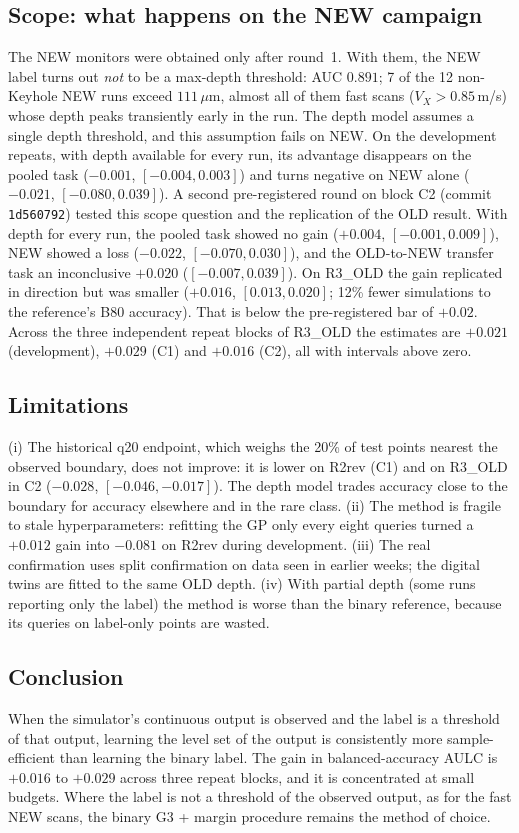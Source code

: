 \subsection{Scope: what happens on the NEW campaign}
The NEW monitors were obtained only after round~1. With them, the NEW label turns out \emph{not} to be a max-depth
threshold: AUC $0.891$; 7 of the 12 non-Keyhole NEW runs exceed $111\,\mu$m, almost all of them fast scans
($V_X>0.85$\,m/s) whose depth peaks transiently early in the run. The depth model assumes a single depth threshold,
and this assumption fails on NEW. On the development repeats, with depth available for every run, its advantage
disappears on the pooled task ($-0.001$, $[-0.004, 0.003]$) and turns negative on NEW alone ($-0.021$,
$[-0.080, 0.039]$). A second pre-registered round on block C2 (commit \texttt{1d560792}) tested this scope question and the
replication of the OLD result. With depth for every run, the pooled task showed no gain ($+0.004$, $[-0.001, 0.009]$), NEW showed a loss
($-0.022$, $[-0.070, 0.030]$), and the OLD-to-NEW transfer task an inconclusive $+0.020$ ($[-0.007, 0.039]$). On R3\_OLD the gain replicated in direction but was smaller
($+0.016$, $[0.013, 0.020]$; 12\% fewer simulations to the reference's B80 accuracy). That is below the
pre-registered bar of $+0.02$. Across the three independent repeat blocks of R3\_OLD the estimates are $+0.021$ (development),
$+0.029$ (C1) and $+0.016$ (C2), all with intervals above zero.

\subsection{Limitations}
(i) The historical q20 endpoint, which weighs the 20\% of test points nearest the observed boundary, does not improve:
it is lower on R2rev (C1) and on R3\_OLD in C2 ($-0.028$, $[-0.046, -0.017]$). The depth model trades accuracy close to
the boundary for accuracy elsewhere and in the rare class. (ii) The method is fragile to stale hyperparameters: refitting the GP only every eight queries
turned a $+0.012$ gain into $-0.081$ on R2rev during development. (iii) The real confirmation uses split
confirmation on data seen in earlier weeks; the digital twins are fitted to the same OLD depth. (iv) With partial
depth (some runs reporting only the label) the method is worse than the binary reference, because its queries on
label-only points are wasted.

\subsection{Conclusion}
When the simulator's continuous output is observed and the label is a threshold of that output, learning the level
set of the output is consistently more sample-efficient than learning the binary label. The gain in balanced-accuracy
AULC is $+0.016$ to $+0.029$ across three repeat blocks, and it is concentrated at small budgets. Where the label is
not a threshold of the observed output, as for the fast NEW scans, the binary G3 + margin procedure remains the method
of choice.

